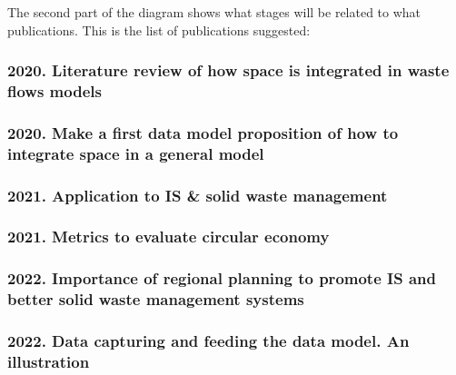 The second part of the diagram shows what stages will be related to what publications. This is the list of publications suggested: 



\subsubsection{2020. Literature review of how space is integrated in waste flows models}


\subsubsection{2020. Make a first data model proposition of how to integrate space in a general model}


\subsubsection{2021. Application to IS \& solid waste management}


\subsubsection{2021. Metrics to evaluate circular economy}


\subsubsection{2022. Importance of regional planning to promote IS and better solid waste management systems}


\subsubsection{2022. Data capturing and feeding the data model. An illustration} 








